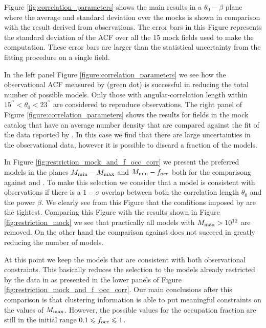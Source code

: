 \documentclass[usenatbib]{mn2e}
\begin{document}
Figure \ref{fig:correlation_parameters} shows the main results in a
$\theta_{0}-\beta$  plane where the average and standard deviation
over the mocks is shown in comparison with the result derived from
observations.  The error bars in this Figure represents the standard
deviation of the ACF over all the 15 mock fields used to make the
computation.  These error bars are larger than the statistical
uncertainty from the fitting procedure on a single field. 

In the left panel Figure \ref{figure:correlation_parameters} we see
how the observational ACF measured by \cite{Hayashino2004} (green dot)
is successful in reducing the total number of possible models. Only
those with angular-correlation length within
$15^{\prime\prime}<\theta_{0}<23^{\prime\prime}$ are considered to
reproduce observations. The right panel of Figure
\ref{figure:correlation_parameters} shows the results for fields in
the mock catalog that have an average number density that are compared
against the fit of the data reported by \cite{Ouchi2010}. In this case
we find that there are large uncertainties in the observational data,
however it is possible to discard a fraction of the models.


In Figure \ref{fig:restriction_mock_and_f_occ_corr} we present the preferred
models in the planes $M_{\rm min}-M_{\rm  max}$ and $M_{\rm min}-f_{\rm occ}$
both for the comparisong against \cite{Hayashino2004} and
\cite{Ouchi2010}. To make this selection we consider that
a model is consistent with observations if there is a $1-\sigma$
overlap between both the correlation length $\theta_0$ and the power
$\beta$. We clearly see from this Figure that the conditions imposed
by \cite{Hayashino2004} are the tightest. Comparing this Figure with
the results shown in Figure \ref{fig:restriction_mock} we see that
practically all models with $M_{\rm max}>10^{12}$ are removed. On the
other hand the comparison against \cite{Ouchi2010} does not succeed in
greatly reducing the number of models.

At this point we keep the models that are consistent with both
observational constraints. This basically reduces the selection to the
models already restricted by the data in \cite{Hayashino2004} as
presented in the lower panels of Figure
\ref{fig:restriction_mock_and_f_occ_corr}. Our main conclusions after
this comparison is that clustering information is able to put
meaningful constraints on the values of $M_{\rm max}$. However, the
possible values for the occupation fraction are still in the initial
range $0.1\leq f_{\rm occ}\leq 1$.
\end{document}
